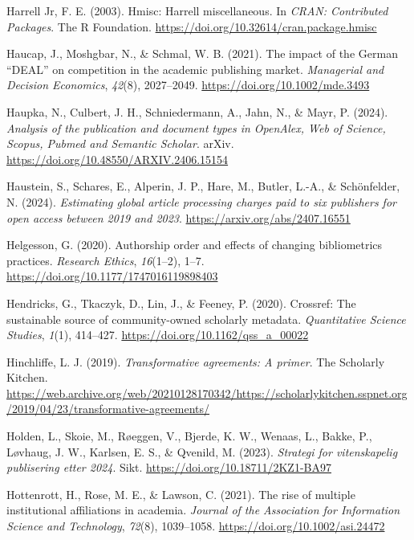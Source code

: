 \documentclass[a4paper,man,floatsintext,longtable,noextraspace,10pt]{apa6}
\newlength{\cslhangindent}
\newenvironment{CSLReferences}[2] %
{\begin{list}{}{%
  \setlength{\itemindent}{0pt}
  \setlength{\leftmargin}{0pt}
  \setlength{\parsep}{0pt}
  \ifodd #1
  \setlength{\leftmargin}{\cslhangindent}
  \setlength{\itemindent}{-1\cslhangindent}
  \fi
  \setlength{\itemsep}{#2\baselineskip}}}
{\end{list}}
\begin{document}
\begin{CSLReferences}{1}{0}
Harrell Jr, F. E. (2003). Hmisc: Harrell miscellaneous. In \emph{CRAN:
Contributed Packages}. The R Foundation.
\url{https://doi.org/10.32614/cran.package.hmisc}

Haucap, J., Moshgbar, N., \& Schmal, W. B. (2021). The impact of the
{German {``DEAL''}} on competition in the academic publishing market.
\emph{Managerial and Decision Economics}, \emph{42}(8), 2027--2049.
\url{https://doi.org/10.1002/mde.3493}

Haupka, N., Culbert, J. H., Schniedermann, A., Jahn, N., \& Mayr, P.
(2024). \emph{Analysis of the publication and document types in
{OpenAlex}, {Web of Science}, {Scopus}, {Pubmed} and {Semantic
Scholar}}. arXiv. \url{https://doi.org/10.48550/ARXIV.2406.15154}

Haustein, S., Schares, E., Alperin, J. P., Hare, M., Butler, L.-A., \&
Schönfelder, N. (2024). \emph{Estimating global article processing
charges paid to six publishers for open access between 2019 and 2023}.
\url{https://arxiv.org/abs/2407.16551}

Helgesson, G. (2020). Authorship order and effects of changing
bibliometrics practices. \emph{Research Ethics}, \emph{16}(1--2), 1--7.
\url{https://doi.org/10.1177/1747016119898403}

Hendricks, G., Tkaczyk, D., Lin, J., \& Feeney, P. (2020). Crossref: The
sustainable source of community-owned scholarly metadata.
\emph{Quantitative Science Studies}, \emph{1}(1), 414--427.
\url{https://doi.org/10.1162/qss_a_00022}

Hinchliffe, L. J. (2019). \emph{Transformative agreements: A primer}.
The Scholarly Kitchen.
\url{https://web.archive.org/web/20210128170342/https://scholarlykitchen.sspnet.org/2019/04/23/transformative-agreements/}

Holden, L., Skoie, M., Røeggen, V., Bjerde, K. W., Wenaas, L., Bakke,
P., Løvhaug, J. W., Karlsen, E. S., \& Qvenild, M. (2023).
\emph{Strategi for vitenskapelig publisering etter 2024}. Sikt.
\url{https://doi.org/10.18711/2KZ1-BA97}

Hottenrott, H., Rose, M. E., \& Lawson, C. (2021). The rise of multiple
institutional affiliations in academia. \emph{Journal of the Association
for Information Science and Technology}, \emph{72}(8), 1039--1058.
\url{https://doi.org/10.1002/asi.24472}


\end{CSLReferences}
\end{document}
